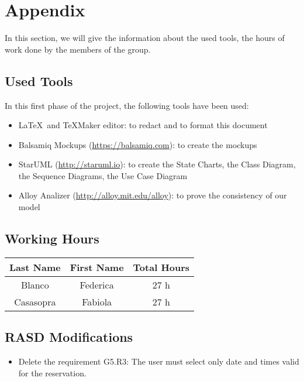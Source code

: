 \section{Appendix} \label{sec:appendix}

In this section, we will give the information about the used tools, the hours of work done by the members of the group.

\subsection{Used Tools} \label{tools}

In this first phase of the project, the following tools have been used:

\begin{itemize}
	\item \LaTeX\ and TeXMaker editor: to redact and to format this document
	\item Balsamiq Mockups (\url{https://balsamiq.com}): to create the mockups
	\item StarUML (\url{http://staruml.io}): to create the State Charts, the Class Diagram, the Sequence Diagrams, the Use Case Diagram 
	\item Alloy Analizer (\url{http://alloy.mit.edu/alloy}): to prove the consistency of our model
\end{itemize}

\subsection{Working Hours} \label{worked}

\begin{table}[htbp]
\begin{center}
\begin{tabular}[t]{ccc}

\hline
\textbf{Last Name} & \textbf{First Name} & \textbf{Total Hours} \\
\hline
Blanco & Federica &  27 h\\
\hline
Casasopra & Fabiola &  27 h\\
\hline

\end{tabular}
\end{center}
\end{table}

\subsection{RASD Modifications} \label{modify}
\begin{itemize}
\item Delete the requirement G5.R3: The user must select only date and times valid for the reservation.
\end{itemize}